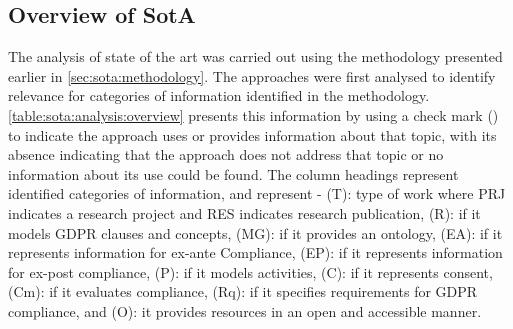 \subsection{Overview of SotA}
The analysis of state of the art was carried out using the methodology presented earlier in \autoref{sec:sota:methodology}.
The approaches were first analysed to identify relevance for categories of information identified in the methodology.
\autoref{table:sota:analysis:overview} presents this information by using a check mark (\cmark) to indicate the approach uses or provides information about that topic, with its absence indicating that the approach does not address that topic or no information about its use could be found.
The column headings represent identified categories of information, and represent - (T): type of work where PRJ indicates a research project and RES indicates research publication, (R): if it models GDPR clauses and concepts, (MG): if it provides an ontology, (EA): if it represents information for ex-ante Compliance, (EP): if it represents information for ex-post compliance, (P): if it models activities, (C): if it represents consent, (Cm): if it evaluates compliance, (Rq): if it specifies requirements for GDPR compliance, and (O): it provides resources in an open and accessible manner.

